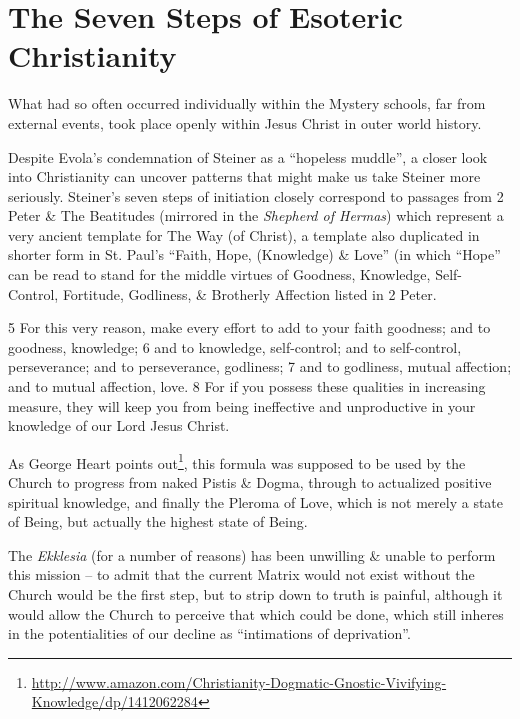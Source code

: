 \section{The Seven Steps of Esoteric Christianity}

\begin{quotex}
What had so often occurred individually within the Mystery schools, far from external events, took place openly within Jesus Christ in outer world history.
\end{quotex}


Despite Evola's condemnation of Steiner as a ``hopeless muddle'', a closer look into Christianity can uncover patterns that might make us take Steiner more seriously. Steiner's seven steps of initiation closely correspond to passages from 2 Peter \& The Beatitudes (mirrored in the \emph{Shepherd of Hermas}) which represent a very ancient template for The Way (of Christ), a template also duplicated in shorter form in St. Paul's ``Faith, Hope, (Knowledge) \& Love'' (in which ``Hope'' can be read to stand for the middle virtues of Goodness, Knowledge, Self-Control, Fortitude, Godliness, \& Brotherly Affection listed in 2 Peter.

\begin{quotex}
5 For this very reason, make every effort to add to your faith goodness; and to goodness, knowledge; 6 and to knowledge, self-control; and to self-control, perseverance; and to perseverance, godliness; 7 and to godliness, mutual affection; and to mutual affection, love. 8 For if you possess these qualities in increasing measure, they will keep you from being ineffective and unproductive in your knowledge of our Lord Jesus Christ.
\end{quotex}


As George Heart points out\footnote{\url{http://www.amazon.com/Christianity-Dogmatic-Gnostic-Vivifying-Knowledge/dp/1412062284}}, this formula was supposed to be used by the Church to progress from naked Pistis \& Dogma, through to actualized positive spiritual knowledge, and finally the Pleroma of Love, which is not merely a state of Being, but actually the highest state of Being.

The \emph{Ekklesia} (for a number of reasons) has been unwilling \& unable to perform this mission -- to admit that the current Matrix would not exist without the Church would be the first step, but to strip down to truth is painful, although it would allow the Church to perceive that which could be done, which still inheres in the potentialities of our decline as ``intimations of deprivation''.

